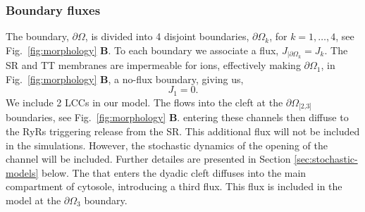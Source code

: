 \subsubsection*{Boundary fluxes}

The boundary, $\partial\Omega$, is divided into 4 disjoint boundaries, $\partial\Omega_k$, for $k=1,\ldots,4$, see Fig.~\ref{fig:morphology} \textbf{B}. To each boundary we associate a flux, $J_{|\partial\Omega_k}=J_k$. The SR and TT membranes are impermeable for ions, effectively making $\partial\Omega_{\scriptscriptstyle\text{1}}$, in Fig.~\ref{fig:morphology} \textbf{B}, a no-flux boundary, giving us,
\begin{equation}
  \label{eq:no-flux}
  J_{\scriptscriptstyle 1}= 0.
\end{equation}
We include 2 LCCs in our model. The \Ca flows into the cleft at the $\partial\Omega_{\scriptscriptstyle\text{[2,3]}}$ boundaries, see Fig.~\ref{fig:morphology} \textbf{B}. \Ca entering these channels then diffuse to the RyRs triggering \Ca release from the SR. This additional \Ca flux will not be included in the simulations. However, the stochastic dynamics of the opening of the channel will be included. Further detailes are presented in Section \ref{sec:stochastic-models} below. The \Ca that enters the dyadic cleft diffuses into the main compartment of cytosole, introducing a third flux. This flux is included in the model at the $\partial\Omega_{\scriptscriptstyle\text{3}}$ boundary.\par

